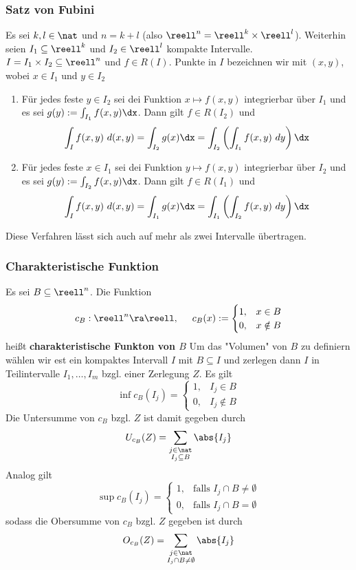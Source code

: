 \documentclass{kit}
\begin{document}
    \subsubsection{Satz von Fubini}
      Es sei $k,l\in\nat$ und $n=k+l$ (also $\reell^n=\reell^k\times\reell^l$). Weiterhin seien $I_1\subseteq\reell^k$ und
      $I_2\in\reell^l$ kompakte Intervalle. $I=I_1\times I_2\subseteq\reell^n$ und $f\in R(I)$. Punkte in $I$ bezeichnen wir
      mit $(x,y)$, wobei $x\in I_1$ und $y\in I_2$
      \begin{enumerate}
        \item Für jedes feste $y\in I_2$ sei dei Funktion $x\mapsto f(x,y)$ integrierbar über $I_1$ und es sei 
          $g(y):=\int_{I_1}f(x,y)\dx$. Dann gilt $f\in R(I_2)$ und
          $$\int_If(x,y)\ d(x,y)=\int_{I_2}g(x)\dx=\int_{I_2}\left(\int_{I_1}f(x,y)\ dy\right)\dx$$
         \item Für jedes feste $x\in I_1$ sei dei Funktion $y\mapsto f(x,y)$ integrierbar über $I_2$ und es sei 
           $g(y):=\int_{I_2}f(x,y)\dx$. Dann gilt $f\in R(I_1)$ und
          $$\int_If(x,y)\ d(x,y)=\int_{I_1}g(x)\dx=\int_{I_1}\left(\int_{I_2}f(x,y)\ dy\right)\dx$$     
      \end{enumerate}
      Diese Verfahren lässt sich auch auf mehr als zwei Intervalle übertragen.
    \subsubsection{Charakteristische Funktion}
      Es sei $B\subseteq\reell^n$. Die Funktion
      $$c_B:\reell^n\ra\reell,\hspace{0.5cm}c_B(x):=\begin{cases}
        1, & x\in B\\
        0, & x\notin B
      \end{cases}$$
      heißt \textbf{charakteristische Funkton von $B$}
      Um das "Volumen" von $B$ zu definiern wählen wir est ein kompaktes Intervall $I$ mit $B\subseteq I$ und zerlegen
      dann $I$ in Teilintervalle $I_1,\dots,I_m$ bzgl. einer Zerlegung $Z$. Es gilt
      $$\inf c_B(I_j)=\begin{cases}
        1, & I_j\in B\\
        0, & I_j\notin B
      \end{cases}$$
      Die Untersumme von $c_B$ bzgl. $Z$ ist damit gegeben durch
      $$U_{c_B}(Z)=\sum_{\substack{j\in\nat \\ I_j\subseteq B}}\abs{I_j}$$
      Analog gilt
      $$\sup c_B(I_j)=\begin{cases}
        1, & \text{falls }I_j\cap B\neq\emptyset\\
        0, & \text{falls }I_j\cap B=\emptyset
      \end{cases}$$
      sodass die Obersumme von $c_B$ bzgl. $Z$ gegeben ist durch
      $$O_{c_B}(Z)=\sum_{\substack{j\in\nat\\ I_j\cap B\neq\emptyset}}\abs{I_j}$$
\end{document}
